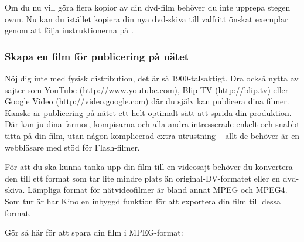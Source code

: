 \documentclass[a4paper,final]{memoir} %
\begin{document}

Om du nu vill göra flera kopior av din dvd-film behöver du inte upprepa stegen ovan. Nu kan du istället kopiera din nya dvd-skiva till valfritt önskat exemplar genom att följa instruktionerna på .


\subsubsection{Skapa en film för publicering på nätet}


Nöj dig inte med fysisk distribution, det är så 1900-talsaktigt. Dra också nytta av sajter som YouTube (\url{http://www.youtube.com}), Blip-TV (\url{http://blip.tv}) eller Google Video (\url{http://video.google.com}) där du själv kan publicera dina filmer. Kanske är publicering på nätet ett helt optimalt sätt att sprida din produktion. Där kan ju dina farmor, kompisarna och alla andra intresserade enkelt och snabbt titta på din film, utan någon komplicerad extra utrustning -- allt de behöver är en webbläsare med stöd för Flash-filmer.

För att du ska kunna tanka upp din film till en videosajt behöver du konvertera den till ett format som tar lite mindre plats än original-DV-formatet eller en dvd-skiva. Lämpliga format för nätvideofilmer är bland annat MPEG och MPEG4. Som tur är har Kino en inbyggd funktion för att exportera din film till dessa format.

Gör så här för att spara din film i MPEG-format:
\end{document}
